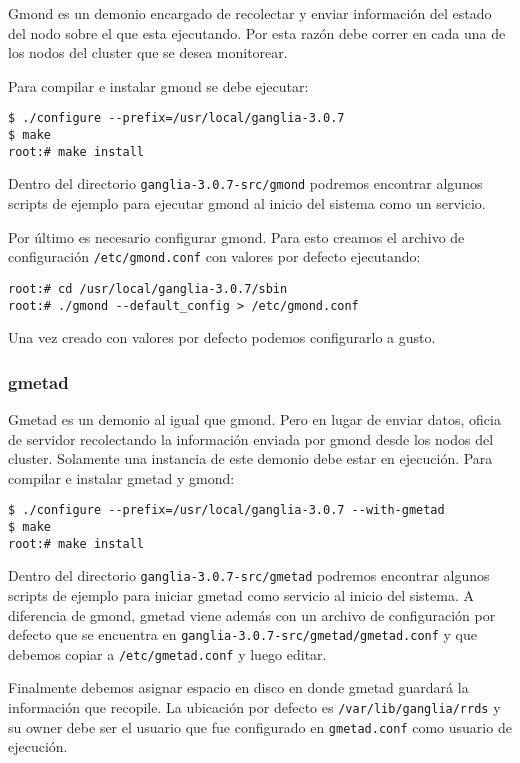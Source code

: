 \documentclass[a4paper,10pt,spanish]{article}
\begin{document}
Gmond es un demonio encargado de recolectar y enviar informaci\'{o}n del estado del nodo sobre el que esta ejecutando. Por esta raz\'{o}n debe correr en cada una de los nodos del cluster que se desea monitorear.

Para compilar e instalar gmond se debe ejecutar:

\begin{verbatim}
$ ./configure --prefix=/usr/local/ganglia-3.0.7
$ make
root:# make install
\end{verbatim}

Dentro del directorio \mbox{\texttt{ganglia-3.0.7-src/gmond}} podremos encontrar algunos scripts de ejemplo para ejecutar gmond al inicio del sistema como un servicio. 

Por \'{u}ltimo es necesario configurar gmond. Para esto creamos el archivo de configuraci\'{o}n \mbox{\texttt{/etc/gmond.conf}} con valores por defecto ejecutando:

\begin{verbatim}
root:# cd /usr/local/ganglia-3.0.7/sbin
root:# ./gmond --default_config > /etc/gmond.conf
\end{verbatim}

Una vez creado con valores por defecto podemos configurarlo a gusto.

\subsubsection{gmetad}

Gmetad es un demonio al igual que gmond. Pero en lugar de enviar datos, oficia de servidor recolectando la informaci\'{o}n enviada por gmond desde los nodos del cluster. Solamente una instancia de este demonio debe
estar en ejecuci\'{o}n. Para compilar e instalar gmetad y gmond:

\begin{verbatim}
$ ./configure --prefix=/usr/local/ganglia-3.0.7 --with-gmetad 
$ make
root:# make install
\end{verbatim}

Dentro del directorio \mbox{\texttt{ganglia-3.0.7-src/gmetad}} podremos encontrar algunos scripts de ejemplo para iniciar gmetad como servicio al inicio del sistema. A diferencia de gmond, gmetad viene adem\'{a}s con un archivo de configuraci\'{o}n por defecto que se encuentra en \mbox{\texttt{ganglia-3.0.7-src/gmetad/gmetad.conf}} y que debemos copiar a \mbox{\texttt{/etc/gmetad.conf}} y luego editar.

Finalmente debemos asignar espacio en disco en donde gmetad guardar\'{a} la informaci\'{o}n que recopile. La ubicaci\'{o}n por defecto es \mbox{\texttt{/var/lib/ganglia/rrds}} y su owner debe ser el usuario que fue configurado en \texttt{gmetad.conf} como usuario de ejecuci\'{o}n.
\end{document}

